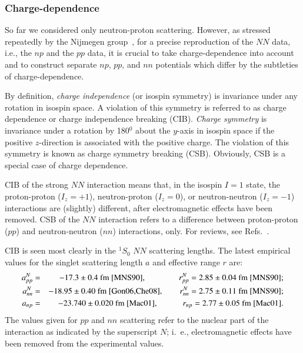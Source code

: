 \documentclass[sort&compress,preprint,3p]{elsarticle}
\begin{document}
\subsubsection{Charge-dependence \label{sec_CD}}

So far we considered only neutron-proton scattering. However, as stressed repeatedly by
the Nijmegen group~\cite{Ber88,Sto93}, for a precise reproduction
of the $NN$ data, i.e., the $np$ and the $pp$ data,
it is crucial to take charge-dependence into account and to construct separate $np$, $pp$,
and $nn$ potentials which differ by the subtleties of charge-dependence.

By definition, {\it charge independence} (or isospin symmetry) is invariance under any 
rotation in isospin space. 
A violation of this symmetry is referred to as charge dependence or
charge independence breaking (CIB).
{\it Charge symmetry} is invariance under a rotation by 180$^0$ about the
$y$-axis in isospin space if the positive $z$-direction is associated
with the positive charge.
The violation of this symmetry is known as charge symmetry breaking (CSB).
Obviously, CSB is a special case of charge dependence.

CIB of the strong $NN$ interaction means that,
in the isospin $I=1$ state, the
proton-proton ($I_z=+1$), 
neutron-proton ($I_z=0$),
or neutron-neutron ($I_z=-1$)
interactions are (slightly) different,
after electromagnetic effects have been removed.
CSB of the $NN$ interaction refers to a difference
between proton-proton ($pp$) and neutron-neutron ($nn$)
interactions, only. 
For reviews, see Refs.~\cite{HM79,Mac89,MNS90,LM98a,LM98b,MS01,Gar09}.


CIB is seen most clearly in the $^1S_0$ 
$NN$ scattering lengths. 
The latest empirical values for the singlet scattering length $a$ 
and effective range $r$ are:
\begin{eqnarray}
a^N_{pp}&=&-17.3\pm 0.4 
\mbox{ fm \cite{MNS90}}, 
\quad \quad \quad \quad
r^N_{pp}=2.85\pm 0.04 \mbox{ fm \cite{MNS90}}; 
\\
a^N_{nn}&=&-18.95\pm 0.40 \mbox{ fm \cite{Gon06,Che08}}, 
\quad \quad 
r^N_{nn} = 2.75\pm 0.11 \mbox{ fm \cite{MNS90}};
 \\
a_{np}&=&-23.740\pm 0.020 \mbox{ fm \cite{Mac01}},
\quad \quad \quad
r_{np}=2.77\pm 0.05 \mbox{ fm \cite{Mac01}}.
\end{eqnarray}
The values given for $pp$ and $nn$ 
scattering refer to the nuclear part of the interaction
as indicated by the superscript $N$; i.~e., 
electromagnetic effects have been removed from the experimental
values. 
\end{document}
